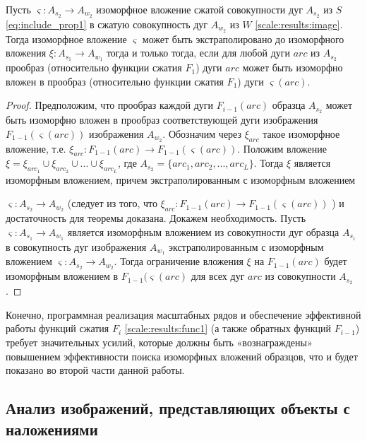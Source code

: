 \begin{theorem}
Пусть  $\varsigma: A_{s_2} \to A_{w_2}$  изоморфное вложение сжатой совокупности дуг $A_{s_2}$ из $S$ \ref{eq:include_prop1} в  сжатую  совокупность дуг $A_{w_2}$ из  $W$ \ref{scale:results:image}. Тогда  изоморфное вложение   $\varsigma$  может быть экстраполировано  до  изоморфного вложения  $\xi: A_{s_1} \to A_{w_1}$ тогда и только тогда, если   для любой дуги $arc$ из $A_{s_2}$ прообраз  (относительно  функции сжатия  $F_1$)  дуги  $arc$ может быть изоморфно вложен в прообраз  (относительно  функции сжатия  $F_1$)   дуги $\varsigma(arc)$.                 
\end{theorem}            
\begin{proof}
Предположим, что  прообраз каждой дуги $F_{i-1}(arc)$ образца $A_{s_2}$  может быть изоморфно вложен в прообраз соответствующей дуги изображения  $F_{1-1}(\varsigma (arc))$  изображения  $A_{w_2}$.  Обозначим через  $\xi_{arc}$ такое изоморфное вложение, т.е.  $\xi_{arc} : F_{1 -1}(arc) \to F_{1 -1}(\varsigma (arc))$.  
Положим вложение $\xi = \xi_{arc_1} \cup \xi_{arc_2} \cup ... \cup \xi_{arc_L}$, где $A_{s_2} = \{arc_1, arc_2, ..., arc_L\}$. Тогда $\xi$ является изоморфным вложением, причем  экстраполированным  с изоморфным вложением  

$\varsigma : A_{s_2} \to A_{w_2}$ (следует из того, что $\xi_{arc} : F_{1 -1}(arc) \to F_{1 -1}(\varsigma (arc))$ ) и достаточность для теоремы  доказана.    
Докажем необходимость. Пусть $\varsigma : A_{s_1} \to A_{w_1}$ является изоморфным вложением из совокупности дуг образца  $A_{s_1}$  в совокупность дуг  изображения  $A_{w_1}$ экстраполированным  с изоморфным вложением  $\varsigma : A_{s_2} \to A_{w_2}$.  Тогда ограничение вложения  $\xi$  на  $F_{1 -1}(arc)$  будет изоморфным вложением в $F_{1 -1}(\varsigma (arc)$  для всех дуг  $arc$  из  совокупности  $A_{s_2}$. 
\end{proof}          

\begin{remark}
Конечно, программная реализация масштабных рядов и обеспечение эффективной работы функций сжатия $F_i$ \ref{scale:results:func1}  (а также обратных функций $F_{i -1}$)  требует  значительных усилий, которые должны быть «вознаграждены» повышением эффективности поиска изоморфных вложений образцов, что и будет показано во второй части данной работы.
\end{remark}

\subsection{Анализ изображений, представляющих объекты с наложениями}

